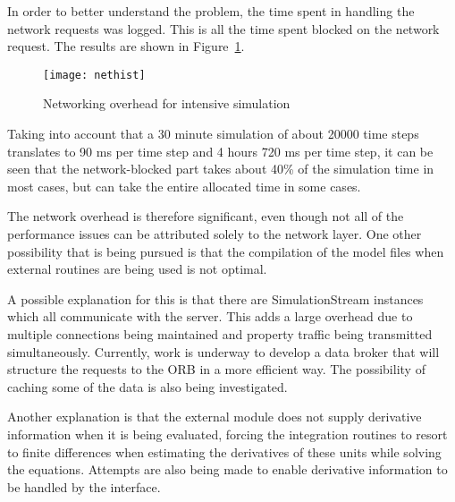 In order to better understand the problem, the time spent in
handling the network requests was logged.  This is all the time spent
blocked on the network request.  The results are shown in
Figure~\ref{fig:overhead}.
\begin{figure}[htbp]
  \centering
  \texttt{[image: nethist]}
  \caption{Networking overhead for intensive simulation}
  \label{fig:overhead}
\end{figure}
Taking into account that a 30 minute simulation of about 20000 time
steps translates to 90 ms per time step and 4 hours 720 ms per time
step, it can be seen that the network-blocked part takes about 40\% of
the simulation time in most cases, but can take the entire allocated
time in some cases.  

The network overhead is therefore significant, even though not all of
the performance issues can be attributed solely to the network layer.
One other possibility that is being pursued is that the compilation of the
model files when external routines are being used is not optimal.

A possible explanation for this is that there are SimulationStream
instances which all communicate with the server.  This adds a large
overhead due to multiple connections being maintained and property
traffic being transmitted simultaneously.  Currently, work is underway
to develop a data broker that will structure the requests to the ORB
in a more efficient way.  The possibility of caching some of the data
is also being investigated.

Another explanation is that the external module does not supply
derivative information when it is being evaluated, forcing the
integration routines to resort to finite differences when estimating
the derivatives of these units while solving the equations.  Attempts
are also being made to enable derivative information to be handled by
the interface.



